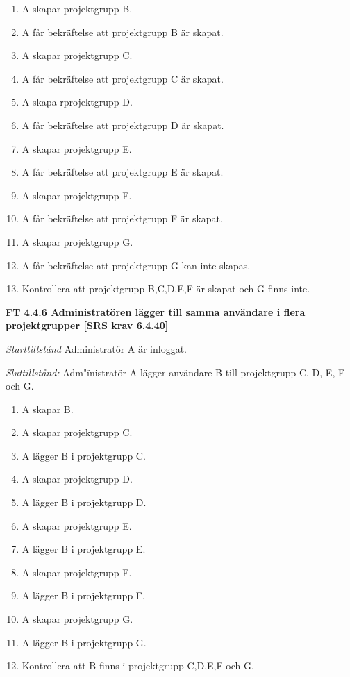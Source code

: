 \documentclass[a4paper]{article}
\begin{document}
\begin{enumerate}
\item A skapar projektgrupp B.
\item A får bekräftelse att projektgrupp B är skapat.
\item A skapar projektgrupp C.
\item A får bekräftelse att projektgrupp C är skapat.
\item A skapa rprojektgrupp D.
\item A får bekräftelse att projektgrupp D är skapat.
\item A skapar projektgrupp E.
\item A får bekräftelse att projektgrupp E är skapat.
\item A skapar projektgrupp F.
\item A får bekräftelse att projektgrupp F är skapat.
\item A skapar projektgrupp G.
\item A får bekräftelse att projektgrupp G kan inte skapas.
\item Kontrollera att projektgrupp B,C,D,E,F är skapat och G finns inte.
\end{enumerate}

\textbf{FT 4.4.6 Administratören lägger till samma användare i flera projektgrupper [SRS krav 6.4.40]}

\emph{Starttillstånd} Administratör A är inloggat.

\emph{Sluttillstånd:} Adm"\"inistratör A lägger användare B till   projektgrupp C, D, E, F och G.

\begin{enumerate}
\item A skapar B.
\item A skapar projektgrupp C.
\item A lägger B i projektgrupp C.
\item A skapar projektgrupp D.
\item A lägger B i projektgrupp D.
\item A skapar projektgrupp E.
\item A lägger B i projektgrupp E.
\item A skapar projektgrupp F.
\item A lägger B i projektgrupp F.
\item A skapar projektgrupp G.
\item A lägger B i projektgrupp G.
\item Kontrollera att B finns i projektgrupp C,D,E,F och G.

\end{enumerate}
\end{document}
